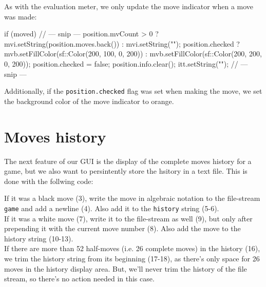 As with the evaluation meter, we only update the move indicator when a move was made:

\begin{cpp}
if (moved) {
  // --- snip ---
  position.mvCount > 0 ? mvi.setString(position.moves.back())
                       : mvi.setString("");
  position.checked ? mvb.setFillColor(sf::Color(200, 100, 0, 200))
                   : mvb.setFillColor(sf::Color(200, 200, 0, 200));
  position.checked = false;
  position.info.clear();
  itt.setString("");
  // --- snip ---
}
\end{cpp}

Additionally, if the \texttt{position.checked} flag was set when making the move,
we set the background color of the move indicator to orange.

\section{Moves history}

The next feature of our GUI is the display of the complete moves history for a game,
but we also want to persintently store the hsitory in a text file.
This is done with the follwing code:


If it was a black move (3), write the move in algebraic notation to the file-stream
\texttt{game} and add a newline (4).
Also add it to the \texttt{history} string (5-6).\\
If it was a white move (7), write it to the file-stream as well (9), but only after
prepending it with the current move number (8).
Also add the move to the history string (10-13).\\
If there are more than 52 half-moves (i.e. 26 complete moves) in the history (16),
we trim the history string from its beginning (17-18), as there's only space for
26 moves in the history display area.
But, we'll never trim the history of the file stream, so there's no action needed
in this case.


